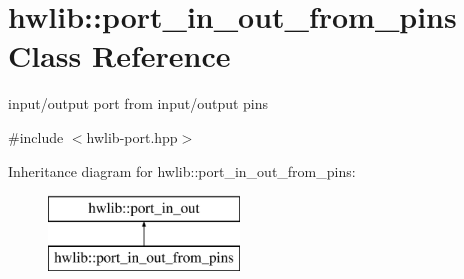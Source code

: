 \hypertarget{classhwlib_1_1port__in__out__from__pins}{}\section{hwlib\+:\+:port\+\_\+in\+\_\+out\+\_\+from\+\_\+pins Class Reference}
\label{classhwlib_1_1port__in__out__from__pins}


input/output port from input/output pins  




{\ttfamily \#include $<$hwlib-\/port.\+hpp$>$}

Inheritance diagram for hwlib\+:\+:port\+\_\+in\+\_\+out\+\_\+from\+\_\+pins\+:\begin{figure}[H]
\begin{center}
\leavevmode
\includegraphics[height=2.000000cm]{classhwlib_1_1port__in__out__from__pins}
\end{center}
\end{figure}
